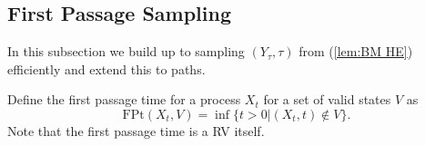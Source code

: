 \documentclass[a4paper,12pt]{article}
\begin{document}

\subsection{First Passage Sampling}
In this subsection we build up to sampling $(Y_{\tau},\tau)$
from (\ref{lem:BM HE}) efficiently and extend this to paths.

\begin{definition} \label{def:first passage time}
    Define the first passage time for a process $X_{t}$ for a set of valid states
    $V$ as
    \begin{equation}
        \text{FPt}(X_{t},V)=\inf \{t>0| (X_{t},t) \notin V \}
        .
    \end{equation}
    Note that the first passage time is a RV itself.
\end{definition}
\end{document}
